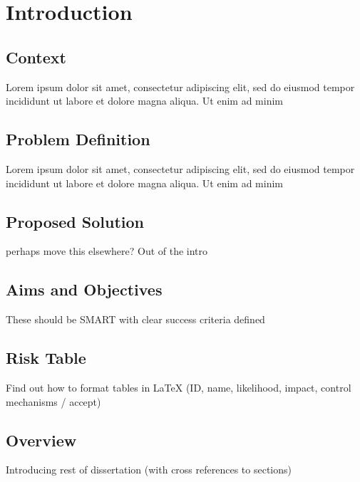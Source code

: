 \chapter{Introduction}
\label{introduction}

\section{Context}

  Lorem ipsum dolor sit amet, consectetur adipiscing elit, sed do eiusmod tempor incididunt ut labore et dolore magna aliqua. Ut enim ad minim

\section{Problem Definition}

  Lorem ipsum dolor sit amet, consectetur adipiscing elit, sed do eiusmod tempor incididunt ut labore et dolore magna aliqua. Ut enim ad minim

\section{Proposed Solution}
  perhaps move this elsewhere? Out of the intro

\section{Aims and Objectives}
  These should be SMART with clear success criteria defined

\section{Risk Table}
  Find out how to format tables in LaTeX
  (ID, name, likelihood, impact, control mechanisms / accept)

\section{Overview}
  Introducing rest of dissertation (with cross references to sections)
